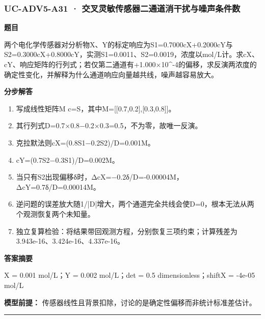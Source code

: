 \documentclass[UTF8,11pt,a4paper]{ctexart}
\begin{document}
\subsubsection*{UC-ADV5-A31 · 交叉灵敏传感器二通道消干扰与噪声条件数}
\noindent\textbf{题目}\par
两个电化学传感器对分析物X、Y的标定响应为S1=0.7000cX+0.2000cY与S2=0.3000cX+0.8000cY，实测S1=0.0011、S2=0.0019，浓度以mol/L计。求cX、cY、响应矩阵的行列式；若仅第二通道有+1.000×10\textasciicircum{}-4的偏移，求反演两浓度的确定性变化，并解释为什么通道响应向量越共线，噪声越容易放大。\par
\medskip\noindent\textbf{分步解答}
\begin{enumerate}
\item 写成线性矩阵M c=S，其中M=[[0.7,0.2],[0.3,0.8]]。
\item 其行列式D=0.7×0.8−0.2×0.3=0.5，不为零，故唯一反演。
\item 克拉默法则cX=(0.8S1−0.2S2)/D=0.001M。
\item cY=(0.7S2−0.3S1)/D=0.002M。
\item 当只有S2出现偏移δ时，ΔcX=−0.2δ/D=-0.00004M，ΔcY=0.7δ/D=0.00014M。
\item 逆问题的误差放大随1/|D|增大，两个通道完全共线会使D=0，根本无法从两个观测恢复两个未知量。
\item 独立复算检验：将结果带回观测方程，分别恢复三项约束；计算残差为 3.943e-16、3.424e-16、4.337e-16。
\end{enumerate}
\noindent\textbf{答案摘要}\par
X = 0.001 mol/L；Y = 0.002 mol/L；det = 0.5 dimensionless；shiftX = -4e-05 mol/L\par
\noindent\textbf{模型前提：}
传感器线性且背景扣除，讨论的是确定性偏移而非统计标准差估计。\par
\medskip\hrule\medskip
{}
\end{document}
